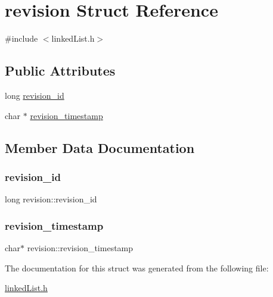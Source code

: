 \hypertarget{structrevision}{}\section{revision Struct Reference}
\label{structrevision}


{\ttfamily \#include $<$linked\+List.\+h$>$}

\subsection*{Public Attributes}
\begin{DoxyCompactItemize}
\item 
long \hyperlink{structrevision_a9ce4e9ca4faf90e68889c2eb298a8abc}{revision\+\_\+id}
\item 
char $\ast$ \hyperlink{structrevision_a84d744f8fa75f9d3bb0679779bf3311f}{revision\+\_\+timestamp}
\end{DoxyCompactItemize}


\subsection{Member Data Documentation}
\mbox{\label{structrevision_a9ce4e9ca4faf90e68889c2eb298a8abc}} 
\subsubsection{\texorpdfstring{revision\+\_\+id}{revision\_id}}
{\footnotesize\ttfamily long revision\+::revision\+\_\+id}

\mbox{\label{structrevision_a84d744f8fa75f9d3bb0679779bf3311f}} 
\subsubsection{\texorpdfstring{revision\+\_\+timestamp}{revision\_timestamp}}
{\footnotesize\ttfamily char$\ast$ revision\+::revision\+\_\+timestamp}



The documentation for this struct was generated from the following file\+:\begin{DoxyCompactItemize}
\item 
\hyperlink{linkedList_8h}{linked\+List.\+h}\end{DoxyCompactItemize}
